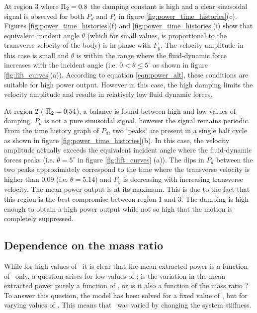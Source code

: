 \vspace{1mm} 
At region 3 where $\Pi_2=0.8$ the damping constant is high and a clear sinusoidal signal is observed for both $P_d$ and $P_t$ in figure \ref{fig:power_time_histories}(c). Figures \ref{fig:power_time_histories}(f) and  \ref{fig:power_time_histories}(i) show that equivalent incident angle $\theta$ (which for small values, is proportional to the transverse velocity of the body) is in phase with $F_y$.  The velocity amplitude in this case is small and $\theta$ is within the range where the fluid-dynamic force increases with the incident angle (i.e. $0<\theta \leq 5^\circ$ as shown in figure \ref{fig:lift_curves}(a)). According to equation \ref{eqn:power_alt}, these conditions are suitable for high power output. However in this case, the high damping limits the velocity amplitude and results in relatively low fluid dynamic forces.

At region 2 ( $\Pi_2=0.54$), a balance is found between high and low values of damping. $P_d$ is not a pure sinusoidal signal, however the signal remains periodic. From the time history graph of $P_d$, two `peaks' are present in a single half cycle as shown in figure \ref{fig:power_time_histories}(b). In this case, the velocity amplitude actually exceeds the equivalent incident angle where the fluid-dynamic forces peaks (i.e. $\theta=5^\circ$ in figure \ref{fig:lift_curves} (a)). The dips in $P_d$ between the two peaks approximately correspond to the time where the transverse velocity is higher than 0.09 (i.e. $\theta=5.14$) and $F_y$ is decreasing with increasing transverse velocity. The mean power output is at its maximum. This is due to the fact that this region is the best compromise between region 1 and 3. The damping is high enough to obtain a high power output while not so high that the motion is completely suppressed.


\subsection{Dependence on the mass ratio \mstar}
\label{sec:mstar}
While for high values of \massstiff\ it is clear that the mean extracted power is a function of \massdamp\ only, a question arises for low values of \massstiff; is the variation in the mean extracted power purely a function of \massstiff, or is it also a function of the mass ratio \mstar? To answer this question, the model has been solved for a fixed value of \massstiff, but for varying values of \mstar. This means that \massstiff\ was varied by changing the system stiffness.

